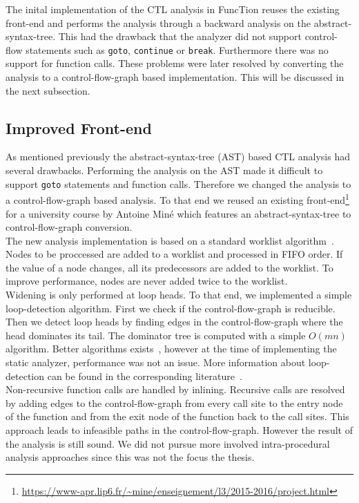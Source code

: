 \documentclass[11pt,a4paper,titlepage]{article}
\theoremstyle{definition}
\begin{document}
The inital implementation of the CTL analysis in FuncTion reuses the existing front-end and performs the analysis through a backward analysis 
on the abstract-syntax-tree. This had the drawback that the analyzer did not support control-flow statements such as \texttt{goto}, \texttt{continue}
or \texttt{break}. Furthermore there was no support for function calls.
These problems were later resolved by converting the analysis to a control-flow-graph based implementation. 
This will be discussed in the next subsection. 

\subsection{Improved Front-end}
As mentioned previously the abstract-syntax-tree (AST) based CTL analysis had several drawbacks. Performing the analysis on the AST made it
difficult to support \texttt{goto} statements and function calls. Therefore we changed the analysis to a control-flow-graph based analysis.
To that end we reused an existing front-end\footnote{\url{https://www-apr.lip6.fr/~mine/enseignement/l3/2015-2016/project.html}}
for a university course by Antoine Miné which features an abstract-syntax-tree to control-flow-graph conversion.\\

The new analysis implementation is based on a standard worklist algorithm~\cite{DBLP:books/daglib/0098888}. Nodes to be proccessed are 
added to a worklist and processed in FIFO order. If the value of a node changes, all its predecessors are added to the worklist. 
To improve performance, nodes are never added twice to the worklist.\\ 

Widening is only performed at loop heads. To that end, we implemented a simple loop-detection algorithm. 
First we check if the control-flow-graph is reducible. Then we detect loop heads by 
finding edges in the control-flow-graph where the head dominates its tail. The dominator tree is computed
with a simple $O(mn)$ algorithm. Better algorithms exists~\cite{Lengauer:1979:FAF:357062.357071}, 
however at the time of implementing the static analyzer, performance was not an issue.
More information about loop-detection can be found in the corresponding literature~\cite{DBLP:books/aw/AhoSU87}.\\

Non-recursive function calls are handled by inlining. Recursive calls are resolved by adding edges to the control-flow-graph
from every call site to the entry node of the function and from the exit node of the function back to the call sites. 
This approach leads to infeasible paths in the control-flow-graph. However the result of the analysis is still sound.
We did not pursue more involved intra-procedural analysis approaches since this was not the focus the thesis.\\
\end{document}
